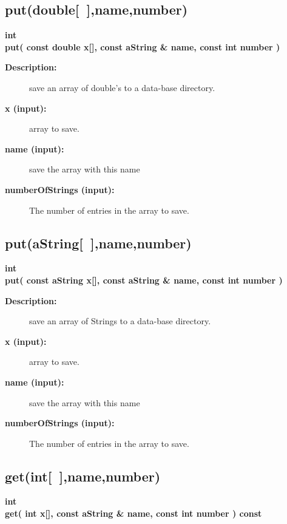 \subsection{put(double[~],name,number) }
 
\begin{flushleft} \textbf{%
int  \\ 
\settowidth{\GenericDataBaseIncludeArgIndent}{put(}%
put( const double x[], const aString \& name, const int number ) 
}\end{flushleft}
    
\begin{description}
\item[{\bf Description:}]  save an array of double's to a data-base directory.
\item[{\bf x (input):}]  array  to save.
\item[{\bf name (input):}]  save the array with this name
\item[{\bf numberOfStrings (input):}]  The number of entries in the array to save.

\end{description}
\subsection{put(aString[~],name,number) }
 
\begin{flushleft} \textbf{%
int  \\ 
\settowidth{\GenericDataBaseIncludeArgIndent}{put(}%
put( const aString x[], const aString \& name, const int number ) 
}\end{flushleft}
    
\begin{description}
\item[{\bf Description:}]  save an array of Strings to a data-base directory.
\item[{\bf x (input):}]  array to save.
\item[{\bf name (input):}]  save the array with this name
\item[{\bf numberOfStrings (input):}]  The number of entries in the array to save.

\end{description}
\subsection{get(int[~],name,number) }
 
\begin{flushleft} \textbf{%
int  \\ 
\settowidth{\GenericDataBaseIncludeArgIndent}{get(}%
get( int x[], const aString \& name, const int number ) const
}\end{flushleft}
    
